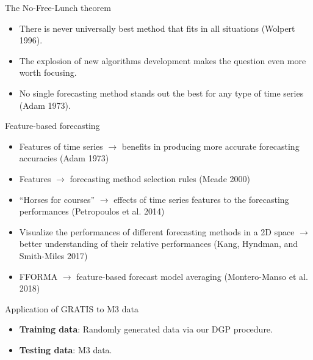 \documentclass[12pt,ignorenonframetext,compress]{beamer}
\providecommand{\tightlist}{%
  \setlength{\itemsep}{0pt}\setlength{\parskip}{0pt}}
\begin{document}
\begin{frame}{The No-Free-Lunch theorem}
\protect\hypertarget{the-no-free-lunch-theorem}{}

\begin{itemize}
\item
  There is never universally best method that fits in all situations
  (Wolpert 1996).
\item
  The explosion of new algorithms development makes the question even
  more worth focusing.
\item
  No single forecasting method stands out the best for any type of time
  series (Adam 1973).
\end{itemize}

\end{frame}


\begin{frame}{Feature-based forecasting}
\protect\hypertarget{literature-1}{}

\begin{itemize}
\item
  Features of time series \(\rightarrow\) benefits in producing more
  accurate forecasting accuracies (Adam 1973)
\item
  Features \(\rightarrow\) forecasting method selection rules (Meade
  2000)
\item
  ``Horses for courses'' \(\rightarrow\) effects of time series features
  to the forecasting performances (Petropoulos et al. 2014)
\item
  Visualize the performances of different
  forecasting methods in a 2D space \(\rightarrow\) better understanding
  of their relative performances (Kang, Hyndman, and Smith-Miles 2017)
\item
  FFORMA \(\rightarrow\) feature-based forecast model averaging (Montero-Manso et al. 2018)
\end{itemize}

\end{frame}

\begin{frame}{Application of GRATIS to M3 data}
\protect\hypertarget{final-aim-forecasting-on-testing-data}{}

\begin{itemize}
\tightlist
\item
  \textbf{Training data}: Randomly generated data via our DGP procedure.
\item
  \textbf{Testing data}: M3 data.
\end{itemize}

\end{frame}
\end{document}
